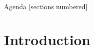 \maketitle

\begin{frame}{Agenda}
  [sections numbered]
  \tableofcontents[hideallsubsections]
\end{frame}

\section{Introduction}
%
%
%
%

